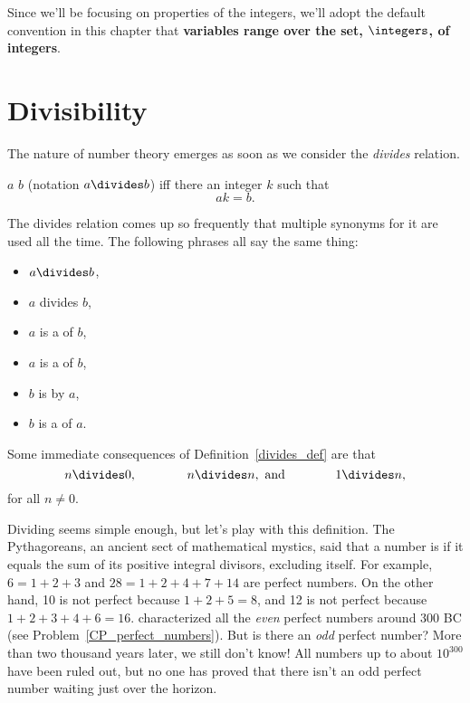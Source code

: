 
Since we'll be focusing on properties of the integers, we'll adopt the
default convention in this chapter that \textbf{variables range over
  the set, $\integers$, of integers}.

\section{Divisibility}\label{divisibility_sec}

The nature of number theory emerges as soon as we consider the \emph{divides} relation.
\begin{definition}\label{divides_def}
$a$  $b$ (notation $a \divides b$) iff there an integer $k$ such that
\[
ak = b.
\]
\end{definition}
The divides relation comes up so frequently that multiple synonyms for it are used all the
time.  The following phrases all say the same thing:
\begin{itemize}
\item $a \divides b$,
\item $a$ divides $b$,
\item $a$ is a  of $b$,
\item $a$ is a  of $b$,
\item $b$ is  by $a$,
\item $b$ is a  of $a$.
\end{itemize}
Some immediate consequences of Definition~\ref{divides_def} are that
\[
n  \divides 0,\qquad\qquad
n  \divides n, \text{ and}\qquad\qquad
1  \divides n,
\]
for all $n \neq 0$.

Dividing seems simple enough, but let's play with this definition.  The Pythagoreans, an
ancient sect of mathematical mystics, said that a number is  if it equals the sum of its positive integral divisors, excluding
itself.  For example, $6 = 1 + 2 + 3$ and $28 = 1 + 2 + 4 + 7 + 14$ are perfect numbers.
On the other hand, 10 is not perfect because $1 + 2 + 5 = 8$, and 12 is not perfect because
$1 + 2 + 3 + 4 + 6 = 16$.   characterized all the \emph{even} perfect numbers
around 300 BC (see Problem~\ref{CP_perfect_numbers}).  But is there an \emph{odd} perfect
number?  More than two thousand years later, we still don't know!  All numbers up to about
$10^{300}$ have been ruled out, but no one has proved that there isn't an odd perfect
number waiting just over the horizon.

